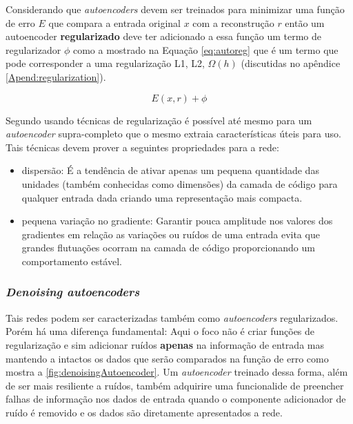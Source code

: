				\par Considerando que \textit{autoencoders} devem ser treinados para minimizar uma função de erro $E$ que compara a entrada original $x$ com a reconstrução $r$ então um autoencoder \textbf{regularizado} deve ter adicionado a essa função um termo de regularizador $\phi$ como a mostrado na Equação \autoref{eq:autoreg} que é um termo que pode corresponder a uma regularização L1, L2, $\Omega(h)$ (discutidas no apêndice \autoref{Apend:regularization}).
				
				\begin{equation}
					\label{eq:autoreg}
					E(x, r) + \phi
				\end{equation}
			
				\par Segundo \cite{Goodfellow-et-al-2016} usando técnicas de regularização é possível até mesmo para um \textit{autoencoder} supra-completo que o mesmo extraia características úteis para uso. Tais técnicas devem prover a seguintes propriedades para a rede:
				
				\begin{itemize}
					\item dispersão: É a tendência de ativar apenas um pequena quantidade das unidades (também conhecidas como dimensões) da camada de código para qualquer entrada dada criando uma representação mais compacta.
					\item pequena variação no gradiente: Garantir pouca amplitude nos valores dos gradientes em relação as variações ou ruídos de uma entrada evita que grandes flutuações ocorram na camada de código proporcionando um comportamento estável.
				\end{itemize}

				
			\subsubsection{\textit{Denoising autoencoders}}
				\par Tais redes podem ser caracterizadas também como \textit{autoencoders} regularizados. Porém há uma diferença fundamental: Aqui o foco não é criar funções de regularização e sim adicionar ruídos \textbf{apenas} na informação de entrada mas mantendo a intactos os dados que serão comparados na função de erro como mostra a  \autoref{fig:denoisingAutoencoder}. Um \textit{autoencoder} treinado dessa forma, além de ser mais resiliente a ruídos, também adquirire uma funcionalide de preencher falhas de informação nos dados de entrada quando o componente adicionador de ruído é removido e os dados são diretamente apresentados a rede.
				
